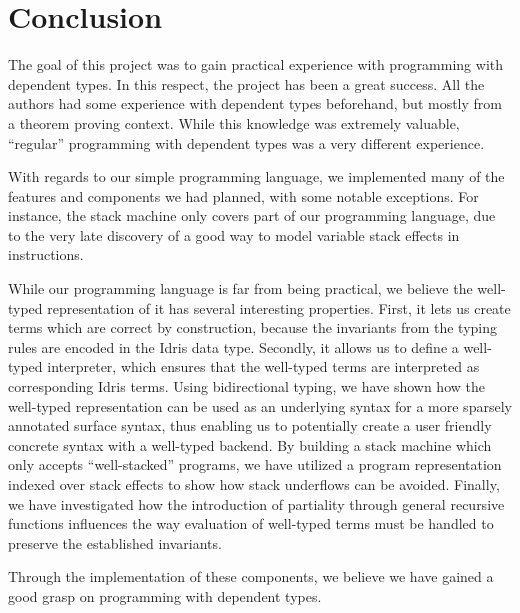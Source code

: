 \section{Conclusion}
\label{sec:conclusion}
The goal of this project was to gain practical experience with programming with dependent types. In this respect, the project has been a great success. All the authors had some experience with dependent types beforehand, but mostly from a theorem proving context. While this knowledge was extremely valuable, ``regular'' programming with dependent types was a very different experience. 

With regards to our simple programming language, we implemented many of the features and components we had planned, with some notable exceptions. For instance, the stack machine only covers part of our programming language, due to the very late discovery of a good way to model variable stack effects in instructions.  

While our programming language is far from being practical, we believe the well-typed representation of it has several interesting properties. First, it lets us create terms which are correct by construction, because the invariants from the typing rules are encoded in the Idris data type. Secondly, it allows us to define a well-typed interpreter, which ensures that the well-typed terms are interpreted as corresponding Idris terms. Using bidirectional typing, we have shown how the well-typed representation can be used as an underlying syntax for a more sparsely annotated surface syntax, thus enabling us to potentially create a user friendly concrete syntax with a well-typed backend. By building a stack machine which only accepts ``well-stacked'' programs, we have utilized a program representation indexed over stack effects to show how stack underflows can be avoided. Finally, we have investigated how the introduction of partiality through general recursive functions influences the way evaluation of well-typed terms must be handled to preserve the established invariants.

Through the implementation of these components, we believe we have gained a good grasp on programming with dependent types.